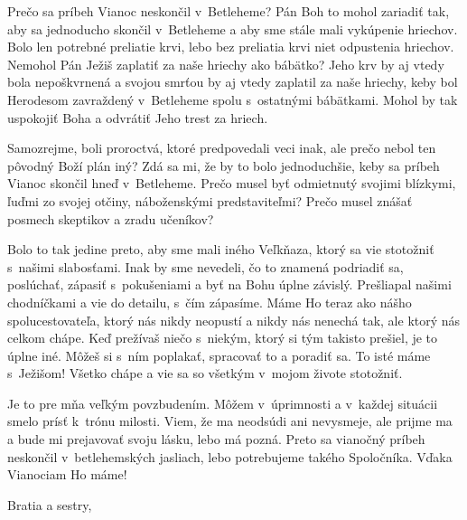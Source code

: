 


Prečo sa príbeh Vianoc neskončil v~Betleheme? Pán Boh to mohol zariadiť tak, aby sa jednoducho skončil v~Betleheme a aby sme stále mali vykúpenie hriechov. Bolo len potrebné preliatie krvi, lebo bez preliatia krvi niet odpustenia hriechov. Nemohol Pán Ježiš zaplatiť za naše hriechy ako bábätko? Jeho krv by aj vtedy bola nepoškvrnená a svojou smrťou by aj vtedy zaplatil za naše hriechy, keby bol Herodesom zavraždený v~Betleheme spolu s~ostatnými bábätkami. Mohol by tak uspokojiť Boha a odvrátiť Jeho trest za hriech.

Samozrejme, boli proroctvá, ktoré predpovedali veci inak, ale prečo nebol ten pôvodný Boží plán iný? Zdá sa mi, že by to bolo jednoduchšie, keby sa príbeh Vianoc skončil hneď v~Betleheme. Prečo musel byť odmietnutý svojimi blízkymi, ľuďmi zo svojej otčiny, náboženskými predstaviteľmi? Prečo musel znášať posmech skeptikov a zradu učeníkov?

Bolo to tak jedine preto, aby sme mali iného Veľkňaza, ktorý sa vie stotožniť s~našimi slabosťami. Inak by sme nevedeli, čo to znamená podriadiť sa, poslúchať, zápasiť s~pokušeniami a byť na Bohu úplne závislý. Prešliapal našimi chodníčkami a vie do detailu, s~čím zápasíme. Máme Ho teraz ako nášho spolucestovateľa, ktorý nás nikdy neopustí a nikdy nás nenechá tak, ale ktorý nás celkom chápe. Keď prežívaš niečo s~niekým, ktorý si tým takisto prešiel, je to úplne iné. Môžeš si s~ním poplakať, spracovať to a poradiť sa. To isté máme s~Ježišom! Všetko chápe a vie sa so všetkým v~mojom živote stotožniť.

Je to pre mňa veľkým povzbudením. Môžem v~úprimnosti a v~každej situácii smelo prísť k~trónu milosti. Viem, že ma neodsúdi ani nevysmeje, ale prijme ma a bude mi prejavovať svoju lásku, lebo má pozná. Preto sa vianočný príbeh neskončil v~betlehemských jasliach, lebo potrebujeme takého Spoločníka. Vďaka Vianociam Ho máme!



Bratia a sestry,

